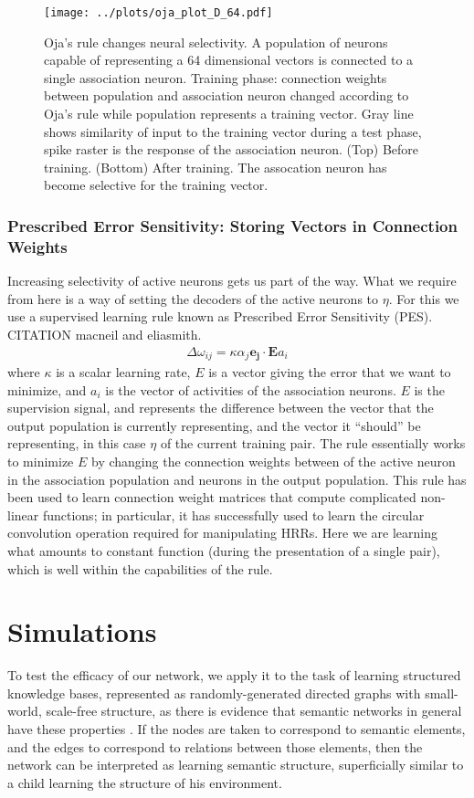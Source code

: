 \documentclass[10pt,letterpaper]{article}
\begin{document}
\begin{figure}[ht]
\begin{center}
\texttt{[image: ../plots/oja\_plot\_D\_64.pdf]}
\end{center}
\caption{Oja's rule changes neural selectivity. A population of neurons capable of representing a 64 dimensional vectors is connected to a single association neuron. Training phase: connection weights between population and association neuron changed according to Oja's rule while population represents a training vector. Gray line shows similarity of input to the training vector during a test phase, spike raster is the response of the association neuron. (Top) Before training. (Bottom) After training. The assocation neuron has become selective for the training vector.}
\label{fig:oja}
\end{figure}

\subsubsection{Prescribed Error Sensitivity: Storing Vectors in Connection Weights}
Increasing selectivity of active neurons gets us part of the way. What we require from here is a way of setting the decoders of the active neurons to $\eta$. For this we use a supervised learning rule known as Prescribed Error Sensitivity (PES). CITATION macneil and eliasmith. 
\begin{align}
\Delta \omega_{ij} = \kappa \alpha_j \mathbf{e_j} \cdot \mathbf{E}a_i
\end{align}
where $\kappa$ is a scalar learning rate, $E$ is a vector giving the error that we want to minimize, and $a_i$ is the vector of activities of the association neurons. $E$ is the supervision signal, and represents the difference between the vector that the output population is currently representing, and the vector it ``should'' be representing, in this case $\eta$ of the current training pair. The rule essentially works to minimize $E$ by changing the connection weights between of the active neuron in the association population and neurons in the output population. This rule has been used to learn connection weight matrices that compute complicated non-linear functions; in particular, it has successfully used to learn the circular convolution operation required for manipulating HRRs. Here we are learning what amounts to constant function (during the presentation of a single pair), which is well within the capabilities of the rule.

\section{Simulations}
To test the efficacy of our network, we apply it to the task of learning structured knowledge bases, represented as randomly-generated directed graphs with small-world, scale-free structure, as there is evidence that semantic networks in general have these properties \citep{Tenenbaum2005}. If the nodes are taken to correspond to semantic elements, and the edges to correspond to relations between those elements, then the network can be interpreted as learning semantic structure, superficially similar to a child learning the structure of his environment.
\end{document}
